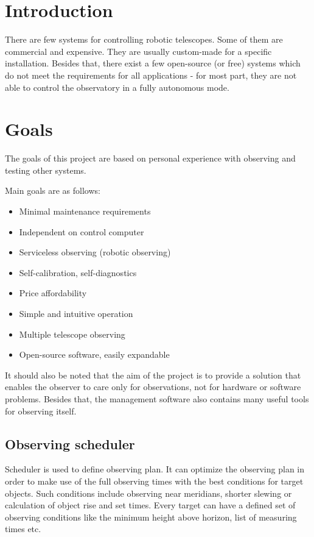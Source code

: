 \documentclass{ibws_template}
\begin{document}

\section{Introduction}
There are few systems for controlling robotic telescopes. Some of them are commercial and expensive. They are usually custom-made for a specific installation. Besides that, there exist a few open-source (or free) systems which do not meet the requirements for all applications - for most part, they are not able to control the observatory in a fully autonomous mode.

\section{Goals}
The goals of this project are based on personal experience with observing and testing other systems.

Main goals are as follows:
\begin{itemize}
\item Minimal maintenance requirements
\item Independent on control computer
\item Serviceless observing (robotic observing)
\item Self-calibration, self-diagnostics
\item Price affordability
\item Simple and intuitive operation
\item Multiple telescope observing
\item Open-source software, easily expandable
\end{itemize}

It should also be noted that the aim of the project is to provide a solution that enables the observer to care only for observations, not for hardware or software problems. Besides that, the management software also contains many useful tools for observing itself.


\subsection{Observing scheduler}
Scheduler is used to define observing plan. It can optimize the observing plan in order to make use of the full observing times with the best conditions for target objects. Such conditions include observing near meridians, shorter slewing or calculation of object rise and set times. Every target can have a defined set of observing conditions like the minimum height above horizon, list of measuring times etc.
\end{document}
